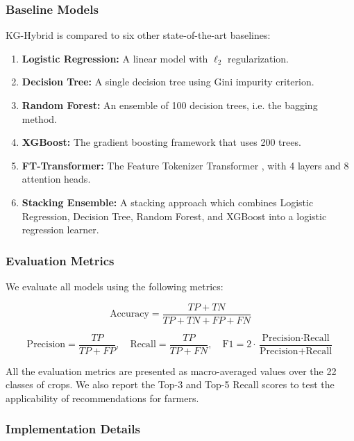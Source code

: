 \documentclass[journal]{IEEEtran}
\begin{document}
\subsubsection{Baseline Models}

KG-Hybrid is compared to six other state-of-the-art baselines:

\begin{enumerate}
    \item \textbf{Logistic Regression:} A linear model with $\ell_2$ regularization. 
    \item \textbf{Decision Tree:} A single decision tree using Gini impurity criterion.
    \item \textbf{Random Forest:} An ensemble of 100 decision trees, i.e. the bagging method.
    \item \textbf{XGBoost:} The gradient boosting framework that uses 200 trees.
    \item \textbf{FT-Transformer:} The Feature Tokenizer Transformer \cite{gorishniy2021revisiting}, with 4 layers and 8 attention heads.
    \item \textbf{Stacking Ensemble:} A stacking approach which combines Logistic Regression, Decision Tree, Random Forest, and XGBoost into a logistic regression learner.
\end{enumerate}

\subsubsection{Evaluation Metrics}

We evaluate all models using the following metrics:

\begin{equation}
\text{Accuracy} = \frac{TP + TN}{TP + TN + FP + FN}
\end{equation}

\begin{equation}
\text{Precision} = \frac{TP}{TP + FP}, \quad \text{Recall} = \frac{TP}{TP + FN}, \quad \text{F1} = 2 \cdot \frac{\text{Precision} \cdot \text{Recall}}{\text{Precision} + \text{Recall}}
\end{equation}

All the evaluation metrics are presented as macro-averaged values over the 22 classes of crops. We also report the Top-3 and Top-5 Recall scores to test the applicability of recommendations for farmers.

\subsubsection{Implementation Details}
\end{document}
